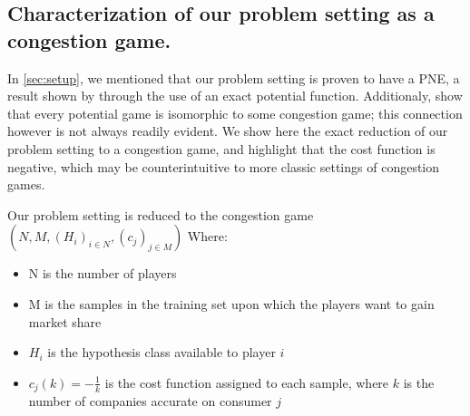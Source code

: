 \subsection{Characterization of our problem setting as a congestion game.} \label{appx:congestion}
In \cref{sec:setup}, we mentioned that our problem setting is proven to have a PNE, a result shown by \citep{ben2019regression} through the use of an exact potential function.
Additionaly, \citep{monderer1996potential} show that every potential game is isomorphic to some congestion game; this connection however is not always readily evident.
We show here the exact reduction of our problem setting to a congestion game, and highlight that the cost function is negative, which may be counterintuitive to more classic settings of congestion games.
\begin{observation}
\label{obs:congestion_game}
    Our problem setting is reduced to the congestion game $(N,M,(H_i)_{i\in N} ,(c_j)_{j\in M})$
    Where:
    \begin{itemize}
        \item N is the number of players
        \item M is the samples in the training set upon which the players want to gain market share
        \item $H_i$ is the hypothesis class available to player $i$
        \item $c_j(k) = -\frac{1}{k}$ is the cost function assigned to each sample, where $k$ is the number of companies accurate on consumer $j$
    \end{itemize}
\end{observation}

